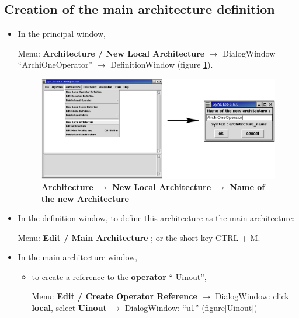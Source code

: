 \documentclass[a4paper,twoside]{report}
\begin{document}
\subsection{Creation of the main architecture definition}
\label{main_archi_ex1}
\begin{itemize}
\item In the principal window, 

Menu: \textbf{Architecture / New Local Architecture} $\rightarrow$
DialogWindow ``ArchiOneOperator'' $\rightarrow$ DefinitionWindow (figure \ref{A_NLA}).

\begin{figure}[htbp]
  \begin{center}
       \includegraphics[width=\linewidth]{Architecture_NewLocalArchitecture.eps}
  \end{center}
  \caption{\textbf{Architecture $\rightarrow$ New Local Architecture $\rightarrow$ Name of the new Architecture}}
  \label{A_NLA}
\end{figure}

\item In the definition window, to define this architecture as the main architecture: 

Menu: \textbf{Edit / Main Architecture} ; or the short key CTRL + M.

\item In the main architecture window,

\begin{itemize}
\item to create a reference to the \textbf{operator} `` Uinout'', 

Menu: \textbf{Edit / Create Operator Reference} $\rightarrow$ DialogWindow: click
\textbf{local}, select \textbf{Uinout} $\rightarrow$ DialogWindow: ``u1'' (figure\ref{Uinout})


\end{itemize}
\end{itemize}
\end{document}
